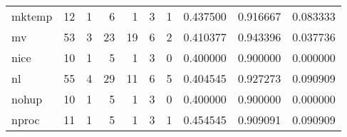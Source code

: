 \begin{tabular}{lrrrrrrrrr}
mktemp    &                                       12 &                                                  1 &                                                  6 &                                                  1 &                                                  3 &                                                  1 &                                           0.437500 &                               0.916667 &                             0.083333 \\
mv        &                                       53 &                                                  3 &                                                 23 &                                                 19 &                                                  6 &                                                  2 &                                           0.410377 &                               0.943396 &                             0.037736 \\
nice      &                                       10 &                                                  1 &                                                  5 &                                                  1 &                                                  3 &                                                  0 &                                           0.400000 &                               0.900000 &                             0.000000 \\
nl        &                                       55 &                                                  4 &                                                 29 &                                                 11 &                                                  6 &                                                  5 &                                           0.404545 &                               0.927273 &                             0.090909 \\
nohup     &                                       10 &                                                  1 &                                                  5 &                                                  1 &                                                  3 &                                                  0 &                                           0.400000 &                               0.900000 &                             0.000000 \\
nproc     &                                       11 &                                                  1 &                                                  5 &                                                  1 &                                                  3 &                                                  1 &                                           0.454545 &                               0.909091 &                             0.090909 \\

\end{tabular}
